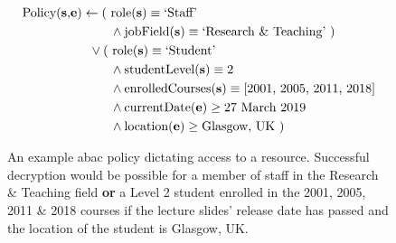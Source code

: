 \begin{figure}[ht]
  \centering
\begin{align*}
  \text{Policy(\textbf{s},\textbf{e})}
  &
    \leftarrow
    \text{( role(\textbf{s})} \equiv \text{`Staff'}
  \\
  &
    \phantom{::::::::}\wedge
    \text{jobField(\textbf{s})} \equiv \text{`Research \& Teaching' )}
  \\
  &
    \phantom{::}\vee
    \text{( role(\textbf{s})} \equiv \text{`Student'}
  \\
  &
    \phantom{::::::::}\wedge
    \text{studentLevel(\textbf{s})} \equiv \text{2}
  \\
  &
    \phantom{::::::::}\wedge
    \text{enrolledCourses(\textbf{s})} \equiv \text{[2001, 2005, 2011, 2018]}
  \\
  &
    \phantom{::::::::}\wedge
    \text{currentDate(\textbf{e})} \geq \text{27 March 2019 }
  \\
  &
    \phantom{::::::::}\wedge
    \text{location(\textbf{e})} \geq \text{Glasgow, UK )}
\end{align*}
  \caption{
    \label{fig:bkgr_abac_policy}
    An example \acrshort{abac} policy dictating access to a resource.
    Successful decryption would be possible for a member of staff in the Research \& Teaching field \textbf{or} a Level 2 student enrolled in the 2001, 2005, 2011 \& 2018 courses if the lecture slides' release date has passed and the location of the student is Glasgow, UK.
  }
\end{figure}
